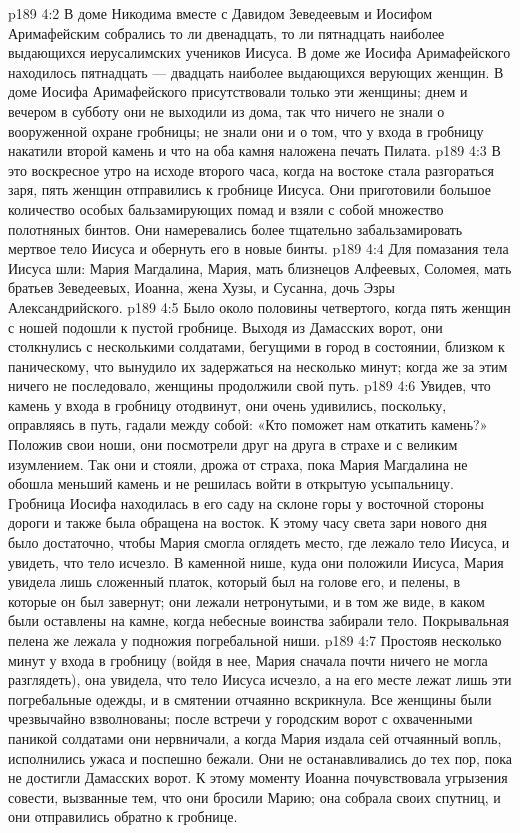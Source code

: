 \vs p189 4:2 \pc В доме Никодима вместе с Давидом Зеведеевым и Иосифом Аримафейским собрались то ли двенадцать, то ли пятнадцать наиболее выдающихся иерусалимских учеников Иисуса. В доме же Иосифа Аримафейского находилось пятнадцать --- двадцать наиболее выдающихся верующих женщин. В доме Иосифа Аримафейского присутствовали только эти женщины; днем и вечером в субботу они не выходили из дома, так что ничего не знали о вооруженной охране гробницы; не знали они и о том, что у входа в гробницу накатили второй камень и что на оба камня наложена печать Пилата.
\vs p189 4:3 В это воскресное утро на исходе второго часа, когда на востоке стала разгораться заря, пять женщин отправились к гробнице Иисуса. Они приготовили большое количество особых бальзамирующих помад и взяли с собой множество полотняных бинтов. Они намеревались более тщательно забальзамировать мертвое тело Иисуса и обернуть его в новые бинты.
\vs p189 4:4 Для помазания тела Иисуса шли: Мария Магдалина, Мария, мать близнецов Алфеевых, Соломея, мать братьев Зеведеевых, Иоанна, жена Хузы, и Сусанна, дочь Эзры Александрийского.
\vs p189 4:5 Было около половины четвертого, когда пять женщин с ношей подошли к пустой гробнице. Выходя из Дамасских ворот, они столкнулись с несколькими солдатами, бегущими в город в состоянии, близком к паническому, что вынудило их задержаться на несколько минут; когда же за этим ничего не последовало, женщины продолжили свой путь.
\vs p189 4:6 Увидев, что камень у входа в гробницу отодвинут, они очень удивились, поскольку, оправляясь в путь, гадали между собой: «Кто поможет нам откатить камень?» Положив свои ноши, они посмотрели друг на друга в страхе и с великим изумлением. Так они и стояли, дрожа от страха, пока Мария Магдалина не обошла меньший камень и не решилась войти в открытую усыпальницу. Гробница Иосифа находилась в его саду на склоне горы у восточной стороны дороги и также была обращена на восток. К этому часу света зари нового дня было достаточно, чтобы Мария смогла оглядеть место, где лежало тело Иисуса, и увидеть, что тело исчезло. В каменной нише, куда они положили Иисуса, Мария увидела лишь сложенный платок, который был на голове его, и пелены, в которые он был завернут; они лежали нетронутыми, и в том же виде, в каком были оставлены на камне, когда небесные воинства забирали тело. Покрывальная пелена же лежала у подножия погребальной ниши.
\vs p189 4:7 Простояв несколько минут у входа в гробницу (войдя в нее, Мария сначала почти ничего не могла разглядеть), она увидела, что тело Иисуса исчезло, а на его месте лежат лишь эти погребальные одежды, и в смятении отчаянно вскрикнула. Все женщины были чрезвычайно взволнованы; после встречи у городским ворот с охваченными паникой солдатами они нервничали, а когда Мария издала сей отчаянный вопль, исполнились ужаса и поспешно бежали. Они не останавливались до тех пор, пока не достигли Дамасских ворот. К этому моменту Иоанна почувствовала угрызения совести, вызванные тем, что они бросили Марию; она собрала своих спутниц, и они отправились обратно к гробнице.
